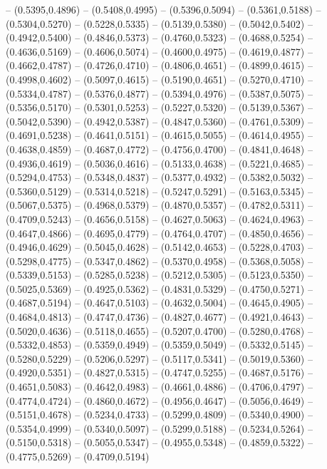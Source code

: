 {	-- (0.5395,0.4896)
	-- (0.5408,0.4995)
	-- (0.5396,0.5094)
	-- (0.5361,0.5188)
	-- (0.5304,0.5270)
	-- (0.5228,0.5335)
	-- (0.5139,0.5380)
	-- (0.5042,0.5402)
	-- (0.4942,0.5400)
	-- (0.4846,0.5373)
	-- (0.4760,0.5323)
	-- (0.4688,0.5254)
	-- (0.4636,0.5169)
	-- (0.4606,0.5074)
	-- (0.4600,0.4975)
	-- (0.4619,0.4877)
	-- (0.4662,0.4787)
	-- (0.4726,0.4710)
	-- (0.4806,0.4651)
	-- (0.4899,0.4615)
	-- (0.4998,0.4602)
	-- (0.5097,0.4615)
	-- (0.5190,0.4651)
	-- (0.5270,0.4710)
	-- (0.5334,0.4787)
	-- (0.5376,0.4877)
	-- (0.5394,0.4976)
	-- (0.5387,0.5075)
	-- (0.5356,0.5170)
	-- (0.5301,0.5253)
	-- (0.5227,0.5320)
	-- (0.5139,0.5367)
	-- (0.5042,0.5390)
	-- (0.4942,0.5387)
	-- (0.4847,0.5360)
	-- (0.4761,0.5309)
	-- (0.4691,0.5238)
	-- (0.4641,0.5151)
	-- (0.4615,0.5055)
	-- (0.4614,0.4955)
	-- (0.4638,0.4859)
	-- (0.4687,0.4772)
	-- (0.4756,0.4700)
	-- (0.4841,0.4648)
	-- (0.4936,0.4619)
	-- (0.5036,0.4616)
	-- (0.5133,0.4638)
	-- (0.5221,0.4685)
	-- (0.5294,0.4753)
	-- (0.5348,0.4837)
	-- (0.5377,0.4932)
	-- (0.5382,0.5032)
	-- (0.5360,0.5129)
	-- (0.5314,0.5218)
	-- (0.5247,0.5291)
	-- (0.5163,0.5345)
	-- (0.5067,0.5375)
	-- (0.4968,0.5379)
	-- (0.4870,0.5357)
	-- (0.4782,0.5311)
	-- (0.4709,0.5243)
	-- (0.4656,0.5158)
	-- (0.4627,0.5063)
	-- (0.4624,0.4963)
	-- (0.4647,0.4866)
	-- (0.4695,0.4779)
	-- (0.4764,0.4707)
	-- (0.4850,0.4656)
	-- (0.4946,0.4629)
	-- (0.5045,0.4628)
	-- (0.5142,0.4653)
	-- (0.5228,0.4703)
	-- (0.5298,0.4775)
	-- (0.5347,0.4862)
	-- (0.5370,0.4958)
	-- (0.5368,0.5058)
	-- (0.5339,0.5153)
	-- (0.5285,0.5238)
	-- (0.5212,0.5305)
	-- (0.5123,0.5350)
	-- (0.5025,0.5369)
	-- (0.4925,0.5362)
	-- (0.4831,0.5329)
	-- (0.4750,0.5271)
	-- (0.4687,0.5194)
	-- (0.4647,0.5103)
	-- (0.4632,0.5004)
	-- (0.4645,0.4905)
	-- (0.4684,0.4813)
	-- (0.4747,0.4736)
	-- (0.4827,0.4677)
	-- (0.4921,0.4643)
	-- (0.5020,0.4636)
	-- (0.5118,0.4655)
	-- (0.5207,0.4700)
	-- (0.5280,0.4768)
	-- (0.5332,0.4853)
	-- (0.5359,0.4949)
	-- (0.5359,0.5049)
	-- (0.5332,0.5145)
	-- (0.5280,0.5229)
	-- (0.5206,0.5297)
	-- (0.5117,0.5341)
	-- (0.5019,0.5360)
	-- (0.4920,0.5351)
	-- (0.4827,0.5315)
	-- (0.4747,0.5255)
	-- (0.4687,0.5176)
	-- (0.4651,0.5083)
	-- (0.4642,0.4983)
	-- (0.4661,0.4886)
	-- (0.4706,0.4797)
	-- (0.4774,0.4724)
	-- (0.4860,0.4672)
	-- (0.4956,0.4647)
	-- (0.5056,0.4649)
	-- (0.5151,0.4678)
	-- (0.5234,0.4733)
	-- (0.5299,0.4809)
	-- (0.5340,0.4900)
	-- (0.5354,0.4999)
	-- (0.5340,0.5097)
	-- (0.5299,0.5188)
	-- (0.5234,0.5264)
	-- (0.5150,0.5318)
	-- (0.5055,0.5347)
	-- (0.4955,0.5348)
	-- (0.4859,0.5322)
	-- (0.4775,0.5269)
	-- (0.4709,0.5194)
}
